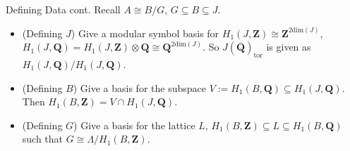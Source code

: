 \documentclass{beamer}
\newcommand{\QQ}{\mathbf{Q}}
\newcommand{\QQbar}{\overline{\mathbf{Q}}}
\newcommand{\ZZ}{\mathbf{Z}}
\renewcommand{\ZZ}{\mathbf{Z}}
\newcommand{\tor}{\mathrm{tor}}
\begin{document}



\begin{frame}{Defining Data cont.}
    Recall $A\cong B/G$, $G\subseteq B \subseteq J$.
    \begin{itemize}
        \item
            (Defining $J$) Give a modular symbol basis for $H_1(J, \ZZ)\cong
            \ZZ^{2\mathrm{dim}(J)}$, $H_1(J, \QQ) = H_1(J, \ZZ)\otimes
            \QQ\cong \QQ^{2\mathrm{dim}(J)}$. So $J(\QQbar)_\tor$ is given as
            $H_1(J, \QQ)/H_1(J, \QQ)$.
        \item
            (Defining $B$) Give a basis for the subspace $V:=H_1(B,
            \QQ)\subseteq H_1(J, \QQ)$. Then $H_1(B, \ZZ)=V\cap H_1(J, \QQ)$.
        \item
            (Defining $G$) Give a basis for the lattice $L$, $H_1(B, \ZZ)
            \subseteq L \subseteq H_1(B, \QQ)$ such that $G\cong \Lambda/H_1(B,
            \ZZ)$.
    \end{itemize}
\end{frame}
\end{document}
